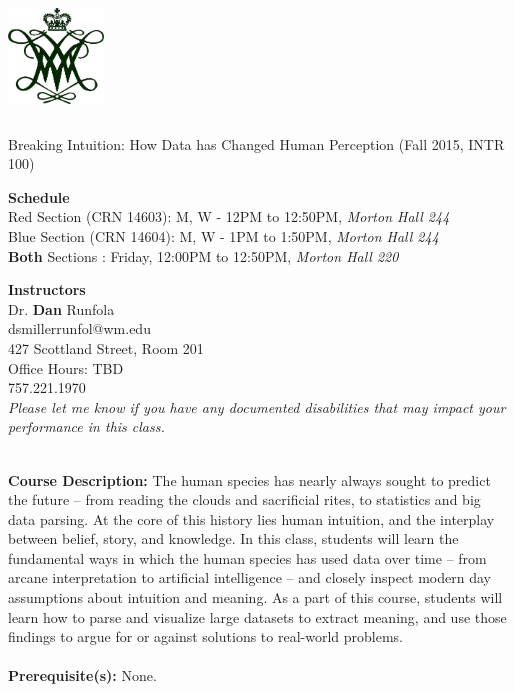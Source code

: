 \documentclass[11pt]{article}
\begin{document}
  \begin{center}

{\includegraphics[height=1.25in,width=1in]{wmchiffre1.jpg}} 

\LARGE Breaking Intuition: How Data has Changed Human Perception (Fall 2015, INTR 100)\\ \vspace{3mm}
\end{center}
\large \textbf{Schedule} \\
\normalsize \color{red}Red \color{black} Section (CRN 14603): M, W - 12PM to 12:50PM, \textit{Morton Hall 244} \\
\color{blue}Blue \color{black} Section (CRN 14604): M, W - 1PM to 1:50PM, \textit{Morton Hall 244} \\
\textbf{Both} \color{black} Sections : Friday, 12:00PM to 12:50PM, \textit{Morton Hall 220} \\
\vspace{2mm}

\large \textbf{Instructors} \\
\large Dr. \textbf{Dan} Runfola \\
\large dsmillerrunfol@wm.edu \\
\large 427 Scottland Street, Room 201 \\
\large Office Hours: TBD \\
\large 757.221.1970 \\

\textit{Please let me know if you have any documented disabilities that may impact your performance in this class.}

\textbf {\large \\ Course Description:} The human species has nearly always sought to predict the future – from reading the clouds and sacrificial rites, to statistics and big data parsing. At the core of this history lies human intuition, and the interplay between belief, story, and knowledge. In this class, students will learn the fundamental ways in which the human species has used data over time – from arcane interpretation to artificial intelligence – and closely inspect modern day assumptions about intuition and meaning. As a part of this course, students will learn how to parse and visualize large datasets to extract meaning, and use those findings to argue for or against solutions to real-world problems. \\
\\
\textbf {Prerequisite(s):} None.
\end{document}
